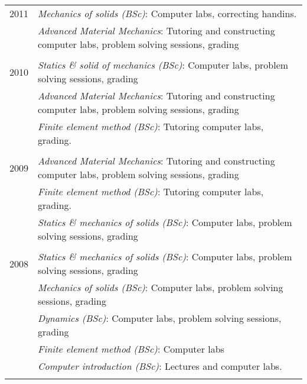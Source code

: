 \documentclass[a4paper,10pt]{article} %
\begin{document}
{\begin{tabular}{r|p{11cm}}

\textsc{2011} 
              & \emph{Mechanics of solids (BSc)}: \footnotesize{Computer labs, correcting handins.}\\
              & \emph{Advanced Material Mechanics}: \footnotesize{Tutoring and constructing computer labs, problem solving sessions, grading}\\
\multicolumn{2}{c}{} \\


\textsc{2010} 
              & \emph{Statics \& solid of mechanics (BSc)}: \footnotesize{Computer labs, problem solving sessions, grading}\\
              & \emph{Advanced Material Mechanics}: \footnotesize{Tutoring and constructing computer labs, problem solving sessions, grading}\\
              & \emph{Finite element method (BSc)}: \footnotesize{Tutoring computer labs, grading.}\\
\multicolumn{2}{c}{} \\


\textsc{2009} 
              & \emph{Advanced Material Mechanics}: \footnotesize{Tutoring and constructing computer labs, problem solving sessions, grading}\\
              & \emph{Finite element method (BSc)}: \footnotesize{Tutoring computer labs, grading.}\\
              & \emph{Statics \& mechanics of solids (BSc)}: \footnotesize{Computer labs, problem solving sessions, grading}\\
\multicolumn{2}{c}{} \\


\textsc{2008} 
              & \emph{Statics \& mechanics of solids (BSc)}: \footnotesize{Computer labs, problem solving sessions, grading}\\
              & \emph{Mechanics of solids (BSc)}: \footnotesize{Computer labs, problem solving sessions, grading}\\
              & \emph{Dynamics (BSc)}: \footnotesize{Computer labs, problem solving sessions, grading}\\
              & \emph{Finite element method (BSc)}: \footnotesize{Computer labs}\\
              & \emph{Computer introduction (BSc)}: \footnotesize{Lectures and computer labs.}\\
\multicolumn{2}{c}{} \\


\end{tabular}}
\end{document}
